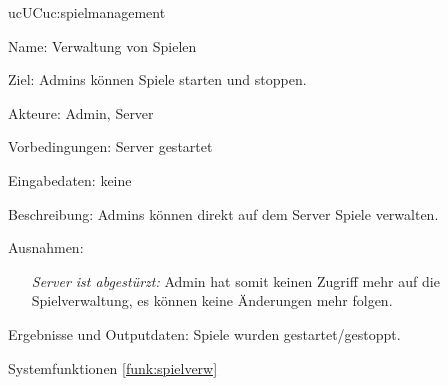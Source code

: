 \begin{description}[leftmargin=5em, style=sameline]
	\begin{lhp}{uc}{UC}{uc:spielmanagement}
		\item [Name:] Verwaltung von Spielen
		\item [Ziel:] Admins können Spiele starten und stoppen.
		\item [Akteure:] Admin, Server
		\item [Vorbedingungen:] Server gestartet
		\item [Eingabedaten:] keine
		\item [Beschreibung:] Admins können direkt auf dem Server Spiele verwalten.
		\item [Ausnahmen:] \begin{itemize}
			\item[] \textit{Server ist abgestürzt:} Admin hat somit keinen Zugriff mehr auf die Spielverwaltung, es können keine Änderungen mehr folgen.
		\end{itemize}
		\item [Ergebnisse und Outputdaten:] Spiele wurden gestartet/gestoppt.
		\item [Systemfunktionen] \ref{funk:spielverw}
	\end{lhp}

				
	

\end{description}

